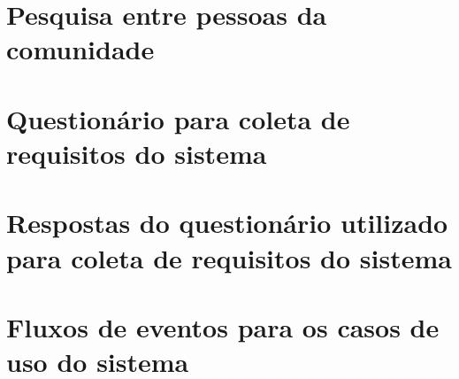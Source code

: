 \chapter{Pesquisa entre pessoas da comunidade}
\label{ch:pesquisa}
% 



\chapter{Questionário para coleta de requisitos do sistema}
\label{ch:coleta-requisitos}




\chapter{Respostas do questionário utilizado para coleta de requisitos do sistema}
\label{ch:coleta-requisitos-respostas}




\chapter{Fluxos de eventos para os casos de uso do sistema}
\label{ch:fluxos-eventos}


